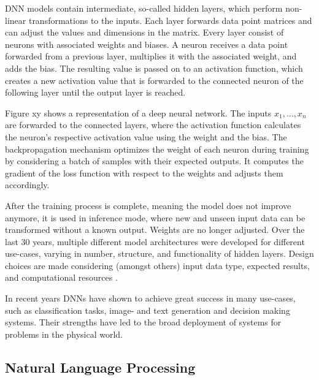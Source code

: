 DNN models contain intermediate, so-called hidden layers, which perform non-linear transformations to the inputs. Each layer forwards data point matrices and can adjust the values and dimensions in the matrix. Every layer consist of neurons with associated weights and biases. A neuron receives a data point forwarded from a previous layer, multiplies it with the associated weight, and adds the bias. The resulting value is passed on to an activation function, which creates a new activation value that is forwarded to the connected neuron of the following layer until the output layer is reached.

Figure xy shows a representation of a deep neural network. The inputs $x_1, \dots, x_n$ are forwarded to the connected layers, where the activation function calculates the neuron's respective activation value using the weight and the bias.
The backpropagation mechanism optimizes the weight of each neuron during training by considering a batch of samples with their expected outputs. It computes the gradient of the loss function with respect to the weights and adjusts them accordingly. 

After the training process is complete, meaning the model does not improve anymore, it is used in inference mode, where new and unseen input data can be transformed without a known output. Weights are no longer adjusted.
Over the last 30 years, multiple different model architectures were developed for different use-cases, varying in number, structure, and functionality of hidden layers. Design choices are made considering  (amongst others) input data type, expected results, and computational resources \cite{buduma2017fundamentals}.

In recent years DNNs have shown to achieve great success in many use-cases, such as classification tasks, image- and text generation and decision making systems. Their strengths have led to the broad deployment of systems for problems in the physical world. 


\subsection{Natural Language Processing}
    \label{sec:natural_language_processing}
    
